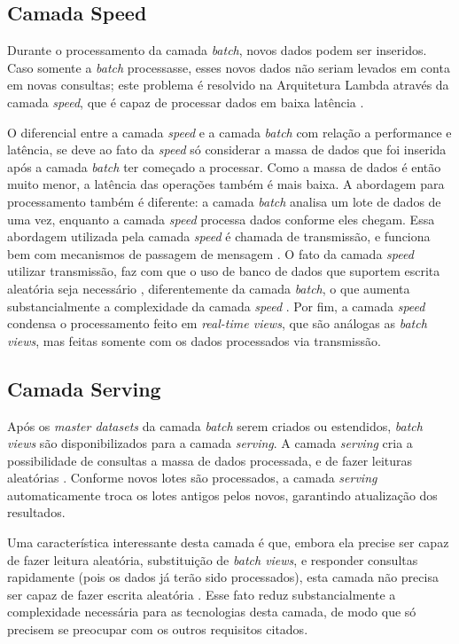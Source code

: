 \subsection{Camada Speed}

Durante o processamento da camada \textit{batch}, novos dados podem ser
inseridos. Caso somente a \textit{batch} processasse, esses novos dados não
seriam levados em conta em novas consultas; este problema é resolvido
na Arquitetura Lambda através da camada \textit{speed}, que é capaz de
processar dados em baixa latência \cite{marz2015}.

O diferencial entre a camada \textit{speed} e a camada \textit{batch} com
relação a performance e latência, se deve ao fato da \textit{speed} só
considerar a massa de dados que foi inserida após a camada \textit{batch}
ter começado a processar. Como a massa de dados é então muito menor, a
latência das operações também é mais baixa. A abordagem para processamento
também é diferente: a camada \textit{batch} analisa um lote de dados de uma
vez, enquanto a camada \textit{speed} processa dados conforme eles chegam.
Essa abordagem utilizada pela camada \textit{speed} é chamada de transmissão,
e funciona bem com mecanismos de passagem de mensagem \cite{marz2015}.
O fato da camada \textit{speed} utilizar transmissão, faz com que o uso de
banco de dados que suportem escrita aleatória seja necessário \cite{marz2015},
diferentemente da camada \textit{batch}, o que aumenta substancialmente
a complexidade da camada \textit{speed} \cite{marz2015}. Por fim, a camada
\textit{speed} condensa o processamento feito em \textit{real-time views}, que
são análogas as \textit{batch views}, mas feitas somente com os dados
processados via transmissão.

\subsection{Camada Serving}

Após os \textit{master datasets} da camada \textit{batch} serem criados ou
estendidos, \textit{batch views} são disponibilizados para a camada
\textit{serving}. A camada \textit{serving} cria a possibilidade de consultas a
massa de dados processada, e de fazer leituras aleatórias \cite{marz2015}.
Conforme novos lotes são processados, a camada \textit{serving}
automaticamente troca os lotes antigos pelos novos, garantindo atualização dos
resultados.

Uma característica interessante desta camada é que, embora ela precise ser
capaz de fazer leitura aleatória, substituição de \textit{batch views}, e
responder consultas rapidamente (pois os dados já terão sido processados),
esta camada não precisa ser capaz de fazer escrita aleatória \cite{marz2015}.
Esse fato reduz substancialmente a complexidade necessária para as tecnologias
desta camada, de modo que só precisem se preocupar com os outros requisitos
citados.

